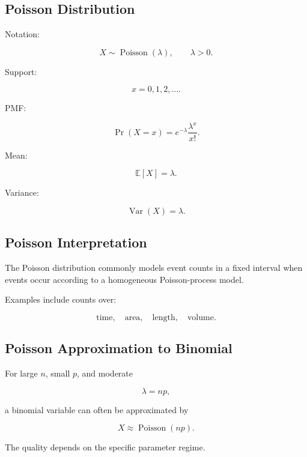 \subsection{Poisson Distribution}
\label{subsec:poisson-distribution-reference}

Notation:

\[
\boxed{
X\sim\operatorname{Poisson}(\lambda),
\qquad
\lambda>0.
}
\]

Support:

\[
\boxed{
x=0,1,2,\ldots.
}
\]

PMF:

\[
\boxed{
\Pr(X=x)
=
e^{-\lambda}
\frac{
\lambda^x
}{
x!
}.
}
\]

Mean:

\[
\boxed{
\mathbb{E}[X]
=
\lambda.
}
\]

Variance:

\[
\boxed{
\operatorname{Var}(X)
=
\lambda.
}
\]

\subsection{Poisson Interpretation}
\label{subsec:poisson-interpretation}

The Poisson distribution commonly models event counts in a fixed interval
when events occur according to a homogeneous Poisson-process model.

Examples include counts over:

\[
\boxed{
\text{time},
\quad
\text{area},
\quad
\text{length},
\quad
\text{volume}.
}
\]

\subsection{Poisson Approximation to Binomial}
\label{subsec:poisson-binomial-approximation}

For large \(n\), small \(p\), and moderate

\[
\lambda=np,
\]

a binomial variable can often be approximated by

\[
\boxed{
X
\approx
\operatorname{Poisson}(np).
}
\]

The quality depends on the specific parameter regime.

